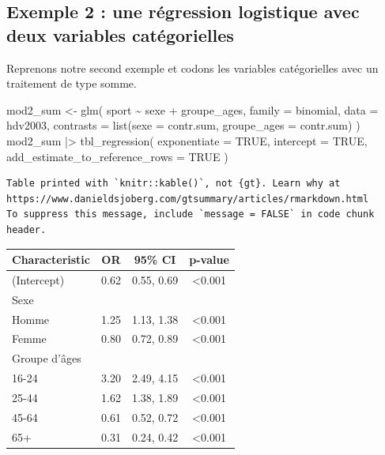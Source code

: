 \documentclass[
  letterpaper,
  DIV=11,
  numbers=noendperiod,
  oneside]{scrreprt}
\newenvironment{Shaded}{\begin{snugshade}}{\end{snugshade}}
\newcommand{\AttributeTok}[1]{\textcolor[rgb]{0.40,0.45,0.13}{#1}}
\newcommand{\ConstantTok}[1]{\textcolor[rgb]{0.56,0.35,0.01}{#1}}
\newcommand{\FunctionTok}[1]{\textcolor[rgb]{0.28,0.35,0.67}{#1}}
\newcommand{\NormalTok}[1]{\textcolor[rgb]{0.00,0.23,0.31}{#1}}
\newcommand{\OtherTok}[1]{\textcolor[rgb]{0.00,0.23,0.31}{#1}}
\newcommand{\SpecialCharTok}[1]{\textcolor[rgb]{0.37,0.37,0.37}{#1}}
\begin{document}
\hypertarget{exemple-2-une-ruxe9gression-logistique-avec-deux-variables-catuxe9gorielles-1}{%
\subsection{Exemple 2 : une régression logistique avec deux variables
catégorielles}\label{exemple-2-une-ruxe9gression-logistique-avec-deux-variables-catuxe9gorielles-1}}

Reprenons notre second exemple et codons les variables catégorielles
avec un traitement de type somme.

\begin{Shaded}
\begin{Highlighting}[]
\NormalTok{mod2\_sum }\OtherTok{\textless{}{-}} \FunctionTok{glm}\NormalTok{(}
\NormalTok{  sport }\SpecialCharTok{\textasciitilde{}}\NormalTok{ sexe }\SpecialCharTok{+}\NormalTok{ groupe\_ages,}
  \AttributeTok{family =}\NormalTok{ binomial,}
  \AttributeTok{data =}\NormalTok{ hdv2003,}
  \AttributeTok{contrasts =} \FunctionTok{list}\NormalTok{(}\AttributeTok{sexe =}\NormalTok{ contr.sum, }\AttributeTok{groupe\_ages =}\NormalTok{ contr.sum)}
\NormalTok{)}
\NormalTok{mod2\_sum }\SpecialCharTok{|\textgreater{}}
  \FunctionTok{tbl\_regression}\NormalTok{(}
    \AttributeTok{exponentiate =} \ConstantTok{TRUE}\NormalTok{,}
    \AttributeTok{intercept =} \ConstantTok{TRUE}\NormalTok{, }
    \AttributeTok{add\_estimate\_to\_reference\_rows =} \ConstantTok{TRUE}
\NormalTok{  )}
\end{Highlighting}
\end{Shaded}

\begin{verbatim}
Table printed with `knitr::kable()`, not {gt}. Learn why at
https://www.danieldsjoberg.com/gtsummary/articles/rmarkdown.html
To suppress this message, include `message = FALSE` in code chunk header.
\end{verbatim}

\begin{longtable}[]{@{}lccc@{}}
\toprule()
\textbf{Characteristic} & \textbf{OR} & \textbf{95\% CI} &
\textbf{p-value} \\
\midrule()
\endhead
(Intercept) & 0.62 & 0.55, 0.69 & \textless0.001 \\
Sexe & & & \\
Homme & 1.25 & 1.13, 1.38 & \textless0.001 \\
Femme & 0.80 & 0.72, 0.89 & \textless0.001 \\
Groupe d'âges & & & \\
16-24 & 3.20 & 2.49, 4.15 & \textless0.001 \\
25-44 & 1.62 & 1.38, 1.89 & \textless0.001 \\
45-64 & 0.61 & 0.52, 0.72 & \textless0.001 \\
65+ & 0.31 & 0.24, 0.42 & \textless0.001 \\
\bottomrule()
\end{longtable}
\end{document}
